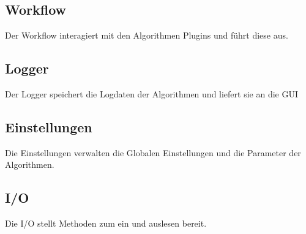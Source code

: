\subsection{Workflow}
Der Workflow interagiert mit den Algorithmen Plugins und führt diese aus.
\subsection{Logger}
Der Logger speichert die Logdaten der Algorithmen und liefert sie an die GUI
\subsection{Einstellungen}
Die Einstellungen verwalten die Globalen Einstellungen und die Parameter der Algorithmen.
\subsection{I/O}
Die I/O stellt Methoden zum ein und auslesen bereit.
